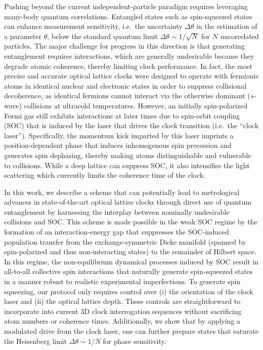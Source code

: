 \documentclass[aps,prx,superscriptaddress,twocolumn]{revtex4-2}
\begin{document}
Pushing beyond the current independent-particle paradigm requires leveraging many-body quantum correlations.
Entangled states such as spin-squeezed states\cite{kitagawa1993squeezed, wineland1992spin, ma2011quantum} can enhance measurement sensitivity, i.e.~the uncertainty $\Delta\theta$ in the estimation of a parameter $\theta$, below the standard quantum limit $\Delta\theta\sim1/\sqrt{N}$ for $N$ uncorrelated particles\cite{itano1993quantum, degen2017quantum}.
The major challenge for progress in this direction is that generating entanglement requires interactions, which are generally undesirable because they degrade atomic coherence, thereby limiting clock performance\cite{swallows2011suppression, martin2013quantum, rey2014probing, ludlow2011coldcollisionshift, lemke2011wave, ludlow2015optical}.
In fact, the most precise and accurate optical lattice clocks were designed to operate with fermionic atoms in identical nuclear and electronic states in order to suppress collisional decoherence\cite{campbell2009probing, swallows2011suppression, campbell2017fermidegenerate}, as identical fermions cannot interact via the otherwise dominant ($s$-wave) collisions at ultracold temperatures.
However, an initially spin-polarized Fermi gas still exhibits interactions at later times due to spin-orbit coupling (SOC) that is induced by the laser that drives the clock transition (i.e.~the ``clock laser'')\cite{wall2016synthetic, kolkowitz2016spinorbitcoupled, livi2016synthetic, bromley2018dynamics}.
Specifically, the momentum kick imparted by this laser imprints a position-dependent phase that induces inhomogenous spin precession and generates spin dephasing, thereby making atoms distinguishable and vulnerable to collisions.
While a deep lattice can suppress SOC, it also intensifies the light scattering which currently limits the coherence time of the clock\cite{dorscher2018latticeinduced, goban2018emergence, hutson2019engineering}.

In this work, we describe a scheme that can potentially lead to metrological advances in state-of-the-art optical lattice clocks through direct use of quantum entanglement by harnessing the interplay between nominally undesirable collisions and SOC.
This scheme is made possible in the weak SOC regime by the formation of an interaction-energy gap that suppresses the SOC-induced population transfer from the exchange-symmetric Dicke manifold (spanned by spin-polarized and thus non-interacting states) to the remainder of Hilbert space.
In this regime, the non-equilibrium dynamical processes induced by SOC result in all-to-all collective spin interactions that naturally generate spin-squeezed states in a manner robust to realistic experimental imperfections.
To generate spin squeezing, our protocol only requires control over (i) the orientation of the clock laser and (ii) the optical lattice depth.
These controls are straightforward to incorporate into current 3D clock interrogation sequences without sacrificing atom numbers or coherence times.
Additionally, we show that by applying a modulated drive from the clock laser, one can further prepare states that saturate the Heisenberg limit $\Delta\theta \sim 1/N$ for phase sensitivity\cite{kitagawa1993squeezed, ma2011quantum, degen2017quantum}.
\end{document}
